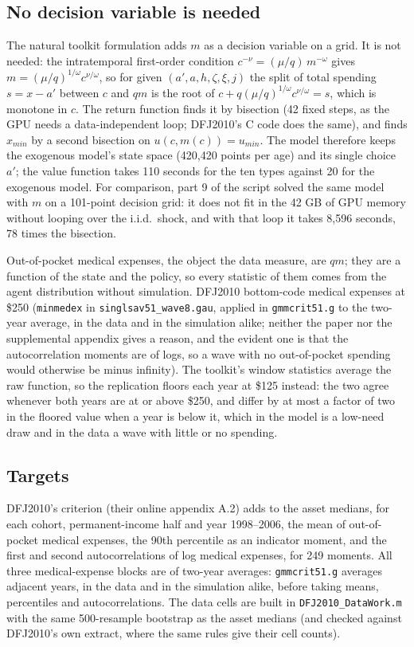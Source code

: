 \documentclass[11pt,fleqn]{article}
\begin{document}
\subsection{No decision variable is needed}
The natural toolkit formulation adds $m$ as a decision variable on a grid. It is not needed: the intratemporal first-order condition $c^{-\nu}=(\mu/q)\,m^{-\omega}$ gives $m=(\mu/q)^{1/\omega}c^{\nu/\omega}$, so for given $(a',a,h,\zeta,\xi,j)$ the split of total spending $s=x-a'$ between $c$ and $qm$ is the root of $c+q(\mu/q)^{1/\omega}c^{\nu/\omega}=s$, which is monotone in $c$. The return function finds it by bisection (42 fixed steps, as the GPU needs a data-independent loop; DFJ2010's C code does the same), and finds $x_{min}$ by a second bisection on $u(c,m(c))=u_{min}$. The model therefore keeps the exogenous model's state space (420,420 points per age) and its single choice $a'$; the value function takes 110 seconds for the ten types against 20 for the exogenous model. For comparison, part 9 of the script solved the same model with $m$ on a 101-point decision grid: it does not fit in the 42 GB of GPU memory without looping over the i.i.d.\ shock, and with that loop it takes 8,596 seconds, 78 times the bisection.

Out-of-pocket medical expenses, the object the data measure, are $qm$; they are a function of the state and the policy, so every statistic of them comes from the agent distribution without simulation. DFJ2010 bottom-code medical expenses at \$250 (\texttt{minmedex} in \texttt{singlsav51\_wave8.gau}, applied in \texttt{gmmcrit51.g} to the two-year average, in the data and in the simulation alike; neither the paper nor the supplemental appendix gives a reason, and the evident one is that the autocorrelation moments are of logs, so a wave with no out-of-pocket spending would otherwise be minus infinity). The toolkit's window statistics average the raw function, so the replication floors each year at \$125 instead: the two agree whenever both years are at or above \$250, and differ by at most a factor of two in the floored value when a year is below it, which in the model is a low-need draw and in the data a wave with little or no spending.

\subsection{Targets}
DFJ2010's criterion (their online appendix A.2) adds to the asset medians, for each cohort, permanent-income half and year 1998--2006, the mean of out-of-pocket medical expenses, the 90th percentile as an indicator moment, and the first and second autocorrelations of log medical expenses, for 249 moments. All three medical-expense blocks are of two-year averages: \texttt{gmmcrit51.g} averages adjacent years, in the data and in the simulation alike, before taking means, percentiles and autocorrelations. The data cells are built in \texttt{DFJ2010\_DataWork.m} with the same 500-resample bootstrap as the asset medians (and checked against DFJ2010's own extract, where the same rules give their cell counts).
\end{document}
